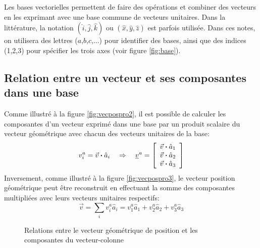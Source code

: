 Les bases vectorielles permettent de faire des opérations et combiner des vecteurs en les exprimant avec une base commune de vecteurs unitaires. Dans la littérature, la notation $(\hat{i},\hat{j},\hat{k})$ ou $(\hat{x},\hat{y},\hat{z})$ est parfois utilisée. Dans ces notes, on utilisera des lettres ($a$,$b$,$c$,...) pour identifier des bases, ainsi que des indices (1,2,3) pour spécifier les trois axes (voir figure \ref{fig:base}).


\subsection{Relation entre un vecteur et ses composantes dans une base}

Comme illustré à la figure \ref{fig:vecpospro2}, il est possible de calculer les composantes d'un vecteur exprimé dans une base par un produit scalaire du vecteur géométrique avec chacun des vecteurs unitaires de la base:
\begin{equation}
 v_i^a = \vec{v} \boldsymbol{\cdot} \hat{a}_i  \quad \Rightarrow \quad
 \underline{v}^{a} = \left[ \begin{array}{c} \vec{v} \boldsymbol{\cdot} \hat{a}_1 \\ \vec{v} \boldsymbol{\cdot} \hat{a}_2 \\ \vec{v} \boldsymbol{\cdot} \hat{a}_3  \end{array} \right]
\end{equation}
Inversement, comme illustré à la figure \ref{fig:vecpospro3}, le vecteur position géométrique peut être reconstruit en effectuant la somme des composantes multipliées avec leurs vecteurs unitaires respectifs:
\begin{equation}
 \vec{v} = \sum_{i} v_i^a \hat{a}_i = v_1^a \hat{a}_1 + v_2^a \hat{a}_2 + v_3^a \hat{a}_3%
\end{equation}
\begin{figure}[H]
 \centering
 \hspace{+20pt}
 \caption{Relations entre le vecteur géométrique de position et les composantes du vecteur-colonne}
 \label{fig:vecpospro23}
\end{figure}


